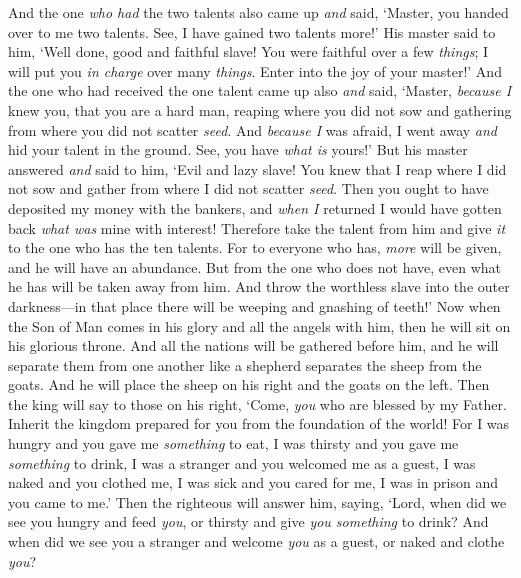 \begin{biblechapter}
\verse And the one \textit{who had} the two talents also came up \textit{and} said, ‘Master, you handed over to me two talents. See, I have gained two talents more!’
\verse His master said to him, ‘Well done, good and faithful slave! You were faithful over a few \textit{things}; I will put you \textit{in charge} over many \textit{things}. Enter into the joy of your master!’
\verse And the one who had received the one talent came up also \textit{and} said, ‘Master, \textit{because I} knew you, that you are a hard man, reaping where you did not sow and gathering from where you did not scatter \textit{seed}.
\verse And \textit{because I} was afraid, I went away \textit{and} hid your talent in the ground. See, you have \textit{what is} yours!’
\verse But his master answered \textit{and} said to him, ‘Evil and lazy slave! You knew that I reap where I did not sow and gather from where I did not scatter \textit{seed}.
\verse Then you ought to have deposited my money with the bankers, and \textit{when I} returned I would have gotten back \textit{what was} mine with interest!
\verse Therefore take the talent from him and give \textit{it} to the one who has the ten talents.
\verse For to everyone who has, \textit{more} will be given, and he will have an abundance. But from the one who does not have, even what he has will be taken away from him.
\verse And throw the worthless slave into the outer darkness—in that place there will be weeping and gnashing of teeth!’
 Now when the Son of Man comes in his glory and all the angels with him, then he will sit on his glorious throne.
\verse And all the nations will be gathered before him, and he will separate them from one another like a shepherd separates the sheep from the goats.
\verse And he will place the sheep on his right and the goats on the left.
\verse Then the king will say to those on his right, ‘Come, \textit{you} who are blessed by my Father. Inherit the kingdom prepared for you from the foundation of the world!
\verse For I was hungry and you gave me \textit{something} to eat, I was thirsty and you gave me \textit{something} to drink, I was a stranger and you welcomed me as a guest,
\verse I was naked and you clothed me, I was sick and you cared for me, I was in prison and you came to me.’
\verse Then the righteous will answer him, saying, ‘Lord, when did we see you hungry and feed \textit{you}, or thirsty and give \textit{you something} to drink?
\verse And when did we see you a stranger and welcome \textit{you} as a guest, or naked and clothe \textit{you}?

\end{biblechapter}
